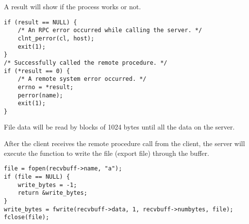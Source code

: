 \documentclass[12pt]{article}
\begin{document}
A result will show if the process works or not.

\begin{verbatim}
if (result == NULL) {
    /* An RPC error occurred while calling the server. */
    clnt_perror(cl, host);
    exit(1);
}
/* Successfully called the remote procedure. */
if (*result == 0) {
    /* A remote system error occurred. */
    errno = *result;
    perror(name);
    exit(1);
}
\end{verbatim}

File data will be read by blocks of 1024 bytes until all the data on the server.

After the client receives the remote procedure call from the client, the server will execute the function to write the file (export file) through the buffer.

\begin{verbatim}
file = fopen(recvbuff->name, "a");
if (file == NULL) {
    write_bytes = -1;
    return &write_bytes;
}
write_bytes = fwrite(recvbuff->data, 1, recvbuff->numbytes, file);
fclose(file);
\end{verbatim}
 
\end{document}
